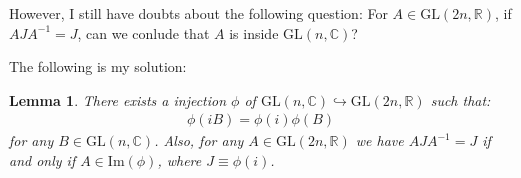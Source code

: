 \documentclass{article}
\numberwithin{equation}{subsection} %
\newtheorem{lemma}{Lemma}[section]
\theoremstyle{definition}
\begin{document}
        However, I still have doubts about the following question:
        For $A\in \mathrm{GL}(2n,\mathbb{R})$, if $AJA^{-1}=J$, can we
        conlude that $A$ is inside $\mathrm{GL}(n,\mathbb{C})$?

        The following is my solution:
        \begin{lemma}
            There exists a injection $\phi$ of $\mathrm{GL}(n,\mathbb{C})
            \hookrightarrow \mathrm{GL}(2n,\mathbb{R})$ such that:
            \begin{align}
                \phi(i B)= \phi(i)\phi(B)
            \end{align}
            for any $B\in \mathrm{GL}(n,\mathbb{C})$. Also, for any
            $A\in \mathrm{GL}(2n,\mathbb{R})$ we have $AJA^{-1}=J$
            if and only if $A\in \mathrm{Im}(\phi)$, where $J\equiv\phi(i)$.
        \end{lemma}
        
\end{document}
